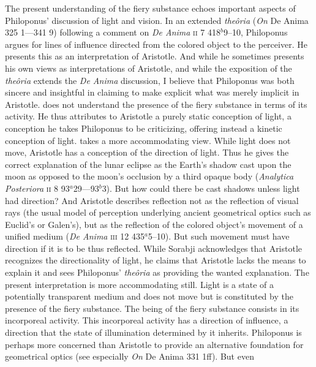 The present understanding of the fiery substance echoes important aspects of Philoponus' discussion of light and vision. In an extended \emph{theôria} (\emph{On} De Anima 325 1---341 9) following a comment on \emph{De Anima} \textsc{ii} 7 418\( ^{b} \)9--10, Philoponus argues for lines of influence directed from the colored object to the perceiver. He presents this as an interpretation of Aristotle. And while he sometimes presents his own views as interpretations of Aristotle, and while the exposition of the \emph{theôria} extends the \emph{De Anima} discussion, I believe that Philoponus was both sincere and insightful in claiming to make explicit what was merely implicit in Aristotle. \citet{Sambursky:1958aa} does not understand the presence of the fiery substance in terms of its activity. He thus attributes to Aristotle a purely static conception of light, a conception he takes Philoponus to be criticizing, offering instead a kinetic conception of light. \citet[26--30]{Sorabji:1987vn} takes a more accommodating view. While light does not move, Aristotle has a conception of the direction of light. Thus he gives the correct explanation of the lunar eclipse as the Earth's shadow cast upon the moon as opposed to the moon's occlusion by a third opaque body (\emph{Analytica Posteriora} \textsc{ii} 8 93\( ^{a} \)29---93\( ^{b} \)3). But how could there be cast shadows unless light had direction? And Aristotle describes reflection not as the reflection of visual rays (the usual model of perception underlying ancient geometrical optics such as Euclid's or Galen's), but as the reflection of the colored object's movement of a unified medium (\emph{De Anima} \textsc{iii} 12 435\( ^{a} \)5--10). But such movement must have direction if it is to be thus reflected. While Sorabji acknowledges that Aristotle recognizes the directionality of light, he claims that Aristotle lacks the means to explain it and sees Philoponus' \emph{theôria} as providing the wanted explanation. The present interpretation is more accommodating still. Light is a state of a potentially transparent medium and does not move but is constituted by the presence of the fiery substance. The being of the fiery substance consists in its incorporeal activity. This incorporeal activity has a direction of influence, a direction that the state of illumination determined by it inherits. Philoponus is perhaps more concerned than Aristotle to provide an alternative foundation for geometrical optics (see especially \emph{On} De Anima 331 1ff). But even 